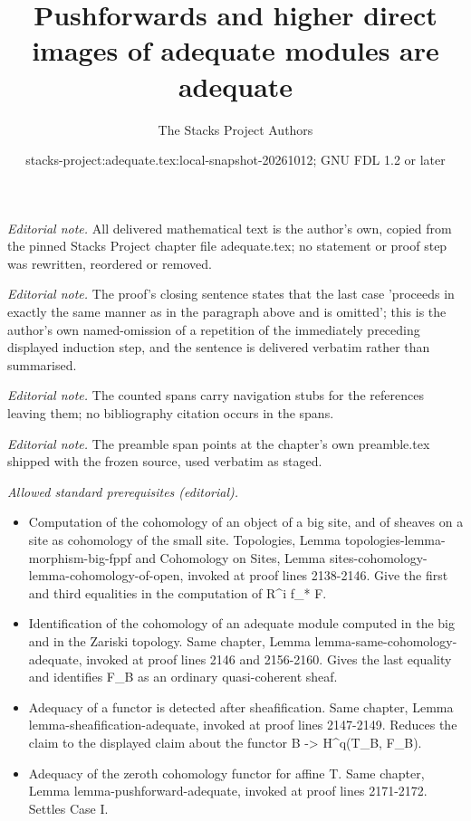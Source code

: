 \documentclass{stacks-project}
\title{Pushforwards and higher direct images of adequate modules are adequate}
\author{The Stacks Project Authors}
\date{stacks-project:adequate.tex:local-snapshot-20261012; GNU FDL 1.2 or later}
\theoremstyle{plain}
\theoremstyle{definition}
\theoremstyle{remark}
\numberwithin{equation}{subsection}
\begin{document}
\maketitle
\noindent\textit{Editorial note.} All delivered mathematical text is the author's own, copied from the pinned Stacks Project chapter file adequate.tex; no statement or proof step was rewritten, reordered or removed.\par\medskip
\noindent\textit{Editorial note.} The proof's closing sentence states that the last case 'proceeds in exactly the same manner as in the paragraph above and is omitted'; this is the author's own named-omission of a repetition of the immediately preceding displayed induction step, and the sentence is delivered verbatim rather than summarised.\par\medskip
\noindent\textit{Editorial note.} The counted spans carry navigation stubs for the references leaving them; no bibliography citation occurs in the spans.\par\medskip
\noindent\textit{Editorial note.} The preamble span points at the chapter's own preamble.tex shipped with the frozen source, used verbatim as staged.\par\medskip
\noindent\textit{Allowed standard prerequisites (editorial).}\begin{itemize}
\item Computation of the cohomology of an object of a big site, and of sheaves on a site as cohomology of the small site. Topologies, Lemma topologies-lemma-morphism-big-fppf and Cohomology on Sites, Lemma sites-cohomology-lemma-cohomology-of-open, invoked at proof lines 2138-2146. Give the first and third equalities in the computation of R\textasciicircum{}i f\_* F.
\item Identification of the cohomology of an adequate module computed in the big and in the Zariski topology. Same chapter, Lemma lemma-same-cohomology-adequate, invoked at proof lines 2146 and 2156-2160. Gives the last equality and identifies F\_B as an ordinary quasi-coherent sheaf.
\item Adequacy of a functor is detected after sheafification. Same chapter, Lemma lemma-sheafification-adequate, invoked at proof lines 2147-2149. Reduces the claim to the displayed claim about the functor B -> H\textasciicircum{}q(T\_B, F\_B).
\item Adequacy of the zeroth cohomology functor for affine T. Same chapter, Lemma lemma-pushforward-adequate, invoked at proof lines 2171-2172. Settles Case I.
\end{itemize}\medskip
\end{document}
